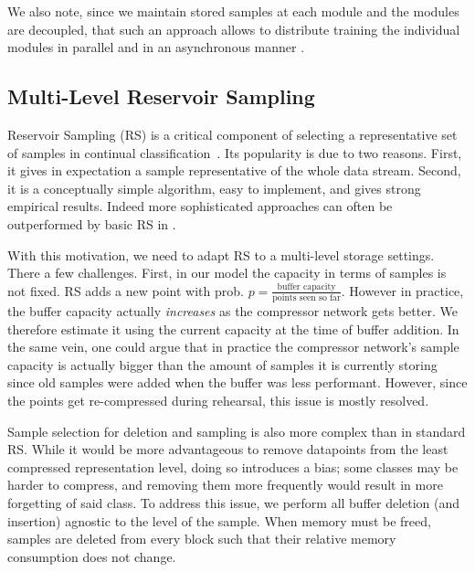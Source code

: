 \documentclass[colorinlistoftodos]{article} %
\begin{document}
 We also note, since we maintain stored samples at each module and the modules are decoupled, that such an approach allows to distribute training the individual modules in parallel and in an asynchronous manner \citep{belilovsky2019decoupled}.


\subsection{Multi-Level Reservoir Sampling}
Reservoir Sampling (RS) is a critical component of selecting a representative set of samples in continual classification~\cite{chaudhry2019continual}. Its popularity is due to two reasons. First, it gives in expectation a sample representative of the whole data stream.  Second, it is a conceptually simple algorithm, easy to implement, and gives strong empirical results. Indeed more sophisticated approaches can often be outperformed by basic RS in \cite{chaudhry2019continual}.

With this motivation, we need to adapt RS to a multi-level storage settings. There a few challenges. First, in our model the capacity in terms of samples is not fixed. RS adds a new point with prob. $p=\frac{\text{buffer capacity}}{\text{points seen so far}}$. However in practice, the buffer capacity actually \emph{increases} as the compressor network gets better. We therefore estimate it using the current capacity at the time of buffer addition. In the same vein, one could argue that in practice the compressor network's sample capacity is actually bigger than the amount of samples it is currently storing since old samples were added when the buffer was less performant. However, since the points get re-compressed during rehearsal, this issue is mostly resolved.

Sample selection for deletion and sampling is also more complex than in standard RS. While it would be more advantageous to remove datapoints from the least compressed representation level, doing so introduces a bias; some classes may be harder to compress, and removing them more frequently would result in more forgetting of said class. To address this issue, we perform all buffer deletion (and insertion) agnostic to the level of the sample. When memory must be freed, samples are deleted from every block such that their relative memory consumption does not change.
    

\end{document}
